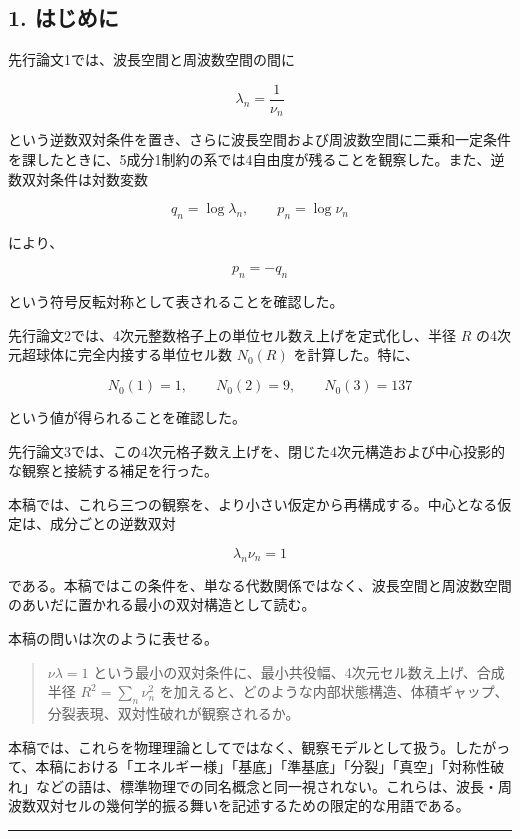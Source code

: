 \documentclass[
]{ltjsarticle}
\begin{document}
\subsection{1. はじめに}\label{ux306fux3058ux3081ux306b}

先行論文1では、波長空間と周波数空間の間に

\[
\lambda_n=\frac{1}{\nu_n}
\]

という逆数双対条件を置き、さらに波長空間および周波数空間に二乗和一定条件を課したときに、5成分1制約の系では4自由度が残ることを観察した。また、逆数双対条件は対数変数

\[
q_n=\log\lambda_n,\qquad p_n=\log\nu_n
\]

により、

\[
p_n=-q_n
\]

という符号反転対称として表されることを確認した。

先行論文2では、4次元整数格子上の単位セル数え上げを定式化し、半径 \(R\)
の4次元超球体に完全内接する単位セル数 \(N_0(R)\) を計算した。特に、

\[
N_0(1)=1,\qquad N_0(2)=9,\qquad N_0(3)=137
\]

という値が得られることを確認した。

先行論文3では、この4次元格子数え上げを、閉じた4次元構造および中心投影的な観察と接続する補足を行った。

本稿では、これら三つの観察を、より小さい仮定から再構成する。中心となる仮定は、成分ごとの逆数双対

\[
\lambda_n\nu_n=1
\]

である。本稿ではこの条件を、単なる代数関係ではなく、波長空間と周波数空間のあいだに置かれる最小の双対構造として読む。

本稿の問いは次のように表せる。

\begin{quote}
\(\nu\lambda=1\)
という最小の双対条件に、最小共役幅、4次元セル数え上げ、合成半径
\(R^2=\sum_n\nu_n^2\)
を加えると、どのような内部状態構造、体積ギャップ、分裂表現、双対性破れが観察されるか。
\end{quote}

本稿では、これらを物理理論としてではなく、観察モデルとして扱う。したがって、本稿における「エネルギー様」「基底」「準基底」「分裂」「真空」「対称性破れ」などの語は、標準物理での同名概念と同一視されない。これらは、波長・周波数双対セルの幾何学的振る舞いを記述するための限定的な用語である。

\begin{center}\rule{0.5\linewidth}{0.5pt}\end{center}
\end{document}
